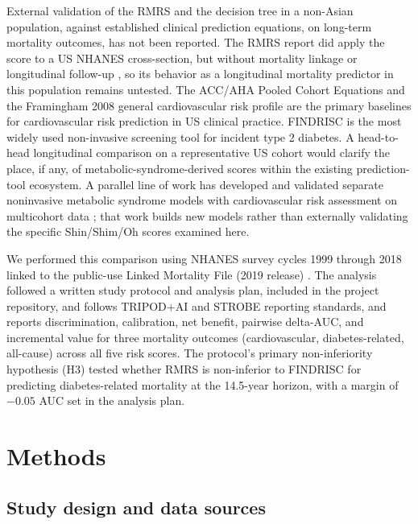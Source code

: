 \documentclass[11pt]{article}
\begin{document}
External validation of the RMRS and the decision tree in a non-Asian population, against established clinical prediction equations, on long-term mortality outcomes, has not been reported. The RMRS report did apply the score to a US NHANES cross-section, but without mortality linkage or longitudinal follow-up \citep{shin2024rmrs}, so its behavior as a longitudinal mortality predictor in this population remains untested. The ACC/AHA Pooled Cohort Equations \citep{goff2014pce} and the Framingham 2008 general cardiovascular risk profile \citep{dagostino2008framingham} are the primary baselines for cardiovascular risk prediction in US clinical practice. FINDRISC \citep{lindstrom2003findrisc} is the most widely used non-invasive screening tool for incident type 2 diabetes. A head-to-head longitudinal comparison on a representative US cohort would clarify the place, if any, of metabolic-syndrome-derived scores within the existing prediction-tool ecosystem. A parallel line of work has developed and validated separate noninvasive metabolic syndrome models with cardiovascular risk assessment on multicohort data \citep{park2025metsmodel}; that work builds new models rather than externally validating the specific Shin/Shim/Oh scores examined here.

We performed this comparison using NHANES survey cycles 1999 through 2018 linked to the public-use Linked Mortality File (2019 release) \citep{nhaneslmf2019}. The analysis followed a written study protocol and analysis plan, included in the project repository, and follows TRIPOD+AI \citep{tripodai2024} and STROBE \citep{strobe2007} reporting standards, and reports discrimination, calibration, net benefit, pairwise delta-AUC, and incremental value for three mortality outcomes (cardiovascular, diabetes-related, all-cause) across all five risk scores. The protocol's primary non-inferiority hypothesis (H3) tested whether RMRS is non-inferior to FINDRISC for predicting diabetes-related mortality at the 14.5-year horizon, with a margin of $-0.05$ AUC set in the analysis plan.

\section*{Methods}

\subsection*{Study design and data sources}
\end{document}
